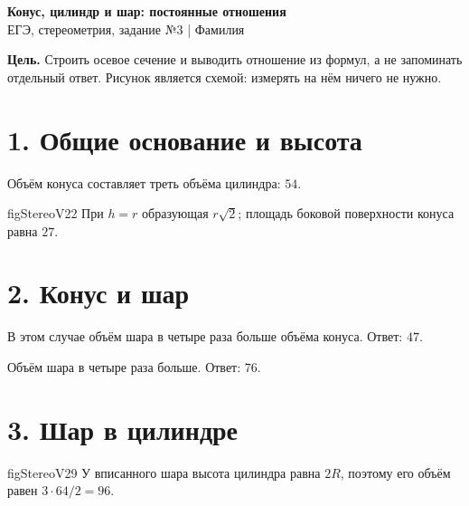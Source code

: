 
\begin{center}
{\Large\textbf{Конус, цилиндр и шар: постоянные отношения}}\\[2mm]
{\small ЕГЭ, стереометрия, задание №3 \quad | \quad Фамилия\ \answerline{6cm}}
\end{center}
\ifteacher
\begin{center}\end{center}
\fi

\textbf{Цель.} Строить осевое сечение и выводить отношение из формул, а не
запоминать отдельный ответ. Рисунок является схемой: измерять на нём ничего не нужно.

\section*{1. Общие основание и высота}
{Объём конуса составляет треть объёма цилиндра: \(54\).}

{\csname figStereoV22\endcsname}
{При \(h=r\) образующая \(r\sqrt2\); площадь боковой поверхности конуса равна \(27\).}

\section*{2. Конус и шар}
{В этом случае объём шара в четыре раза больше объёма конуса. Ответ: \(47\).}

{Объём шара в четыре раза больше. Ответ: \(76\).}

\section*{3. Шар в цилиндре}
{\csname figStereoV29\endcsname}
{У вписанного шара высота цилиндра равна \(2R\), поэтому его объём равен
\(3\cdot64/2=96\).}

